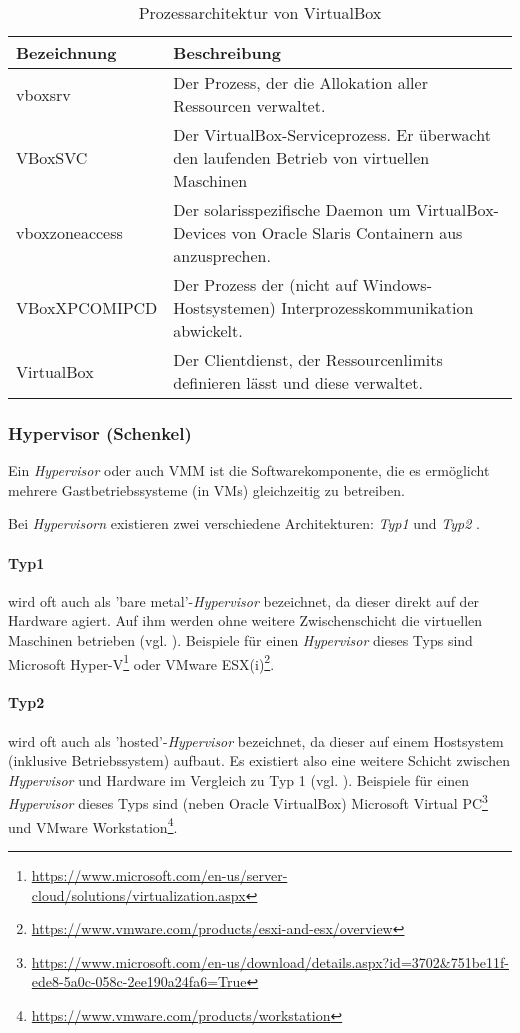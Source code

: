\begin{table}
    \begin{tabularx}{\textwidth}{|l||X|}
    \hline
      \textbf{Bezeichnung} & \textbf{Beschreibung} \\
    \hline
    \hline
      vboxsrv & Der Prozess, der die Allokation aller Ressourcen verwaltet. \\
    \hline
    \hline
      VBoxSVC & Der VirtualBox-Serviceprozess. Er überwacht den laufenden Betrieb von virtuellen Maschinen \\
    \hline
    \hline
      vboxzoneaccess & Der solarisspezifische Daemon um VirtualBox-Devices von Oracle Slaris Containern aus anzusprechen. \\
    \hline
    \hline
      VBoxXPCOMIPCD & Der Prozess der (nicht auf Windows-Hostsystemen) Interprozesskommunikation abwickelt. \\
    \hline
    \hline
      VirtualBox & Der Clientdienst, der Ressourcenlimits definieren lässt und diese verwaltet. \\
    \hline
    \end{tabularx}%
    \caption{Prozessarchitektur von VirtualBox}
\end{table}

\subsubsection{Hypervisor (Schenkel)}
\label{subsubsec:hypervisor}
Ein \textit{Hypervisor} oder auch \ac{VMM} ist die Softwarekomponente, die es ermöglicht
mehrere Gastbetriebssysteme (in VMs) gleichzeitig zu betreiben.

Bei \textit{Hypervisorn} existieren zwei verschiedene Architekturen: \textit{Typ1} und
\textit{Typ2} \cite{dash13}.

\paragraph{Typ1} wird oft auch als 'bare metal'-\textit{Hypervisor} bezeichnet, da dieser direkt
auf der Hardware agiert. Auf ihm werden ohne weitere Zwischenschicht die virtuellen Maschinen
betrieben (vgl. ).
Beispiele für einen \textit{Hypervisor} dieses Typs sind Microsoft Hyper-V\footnote{\url{https://www.microsoft.com/en-us/server-cloud/solutions/virtualization.aspx}}
oder VMware ESX(i)\footnote{\url{https://www.vmware.com/products/esxi-and-esx/overview}}.

\paragraph{Typ2} wird oft auch als 'hosted'-\textit{Hypervisor} bezeichnet, da dieser auf
einem Hostsystem (inklusive Betriebssystem) aufbaut. Es existiert also eine weitere Schicht
zwischen \textit{Hypervisor} und Hardware im Vergleich zu Typ 1 (vgl. ).
Beispiele für einen \textit{Hypervisor} dieses Typs sind (neben Oracle VirtualBox) Microsoft
Virtual PC\footnote{\url{https://www.microsoft.com/en-us/download/details.aspx?id=3702&751be11f-ede8-5a0c-058c-2ee190a24fa6=True}} und
VMware Workstation\footnote{\url{https://www.vmware.com/products/workstation}}.

